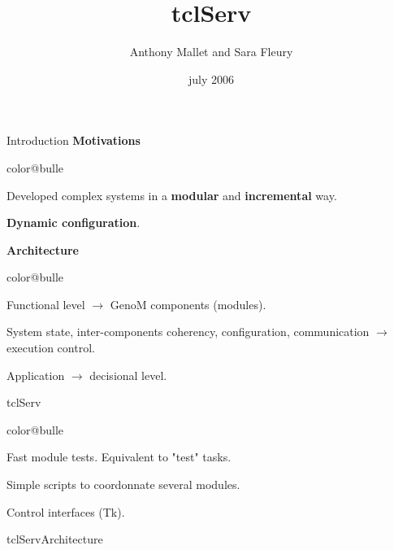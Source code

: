 \documentclass[a4paper,landscape,smooth]{show}
\title{\Huge tclServ}
\author{Anthony Mallet and Sara Fleury}
\date{july 2006}
\begin{document}
\maketitle


\begin{part}{Introduction}{}
   \vfill
   {\bf Motivations}
   \begin{bitemize}{color@bulle}
      \item Developed complex systems in a {\bf modular} and
	    {\bf incremental} way.
      \item {\bf Dynamic configuration}.
   \end{bitemize}
   \vfill
   {\bf Architecture}
   \begin{bitemize}{color@bulle}
      \item  Functional level $\rightarrow$ GenoM components (modules).
      \item System state,  inter-components coherency, configuration,
	    communication $\rightarrow$ execution control.
      \item Application $\rightarrow$ decisional level.
   \end{bitemize}
   \vfill
\end{part}

\begin{tslide}{tclServ}
   \vfill
   \begin{bitemize}{color@bulle}
      \item Fast module tests. Equivalent to
	    "test" tasks.
      \item Simple scripts to coordonnate several modules.
      \item Control interfaces (Tk).
   \end{bitemize}
   \vfill
\end{tslide}


\begin{part}{tclServ}{Architecture}
   \vfill
   \vfill
\end{part}

\end{document}
